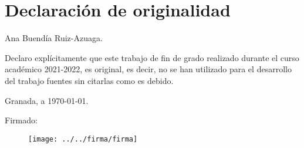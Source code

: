 

\chapter*{Declaración de originalidad}

Ana Buendía Ruiz-Azuaga.

Declaro explícitamente que este trabajo de fin de grado realizado durante el curso académico 2021-2022, es original, es decir, no se han utilizado para el desarrollo del trabajo fuentes sin citarlas como es debido.

Granada, a \today.

Firmado:

\begin{figure}[!h]
\begin{center}
\texttt{[image: ../../firma/firma]}
\end{center}
\end{figure}

